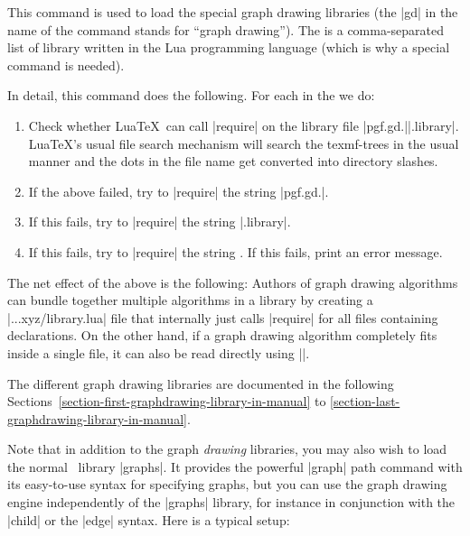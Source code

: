 \begin{command}{\usegdlibrary{}}
    This command is used to load the special graph drawing libraries (the |gd|
    in the name of the command stands for ``graph drawing''). The  is a comma-separated list of library written in the Lua
    programming language (which is why a special command is needed).

    In detail, this command does the following. For each  in the
     we do:
    \begin{enumerate}
        \item Check whether Lua\TeX\ can call |require| on the library file
            |pgf.gd.||.library|. Lua\TeX's usual file search
            mechanism  will search the texmf-trees in the usual manner and the
            dots in the file name get converted into directory slashes.
        \item If the above failed, try to |require| the string
            |pgf.gd.|.
        \item If this fails, try to |require| the string |.library|.
        \item If this fails, try to |require| the string . If this
            fails, print an error message.
    \end{enumerate}
    The net effect of the above is the following: Authors of graph drawing
    algorithms can bundle together multiple algorithms in a library by creating
    a |...xyz/library.lua| file that internally just calls |require| for all
    files containing declarations. On the other hand, if a graph drawing
    algorithm completely fits inside a single file, it can also be read
    directly using |\usegdlibrary|.
\begin{codeexample}
\usetikzlibrary{graphdrawing}
\end{codeexample}

    The different graph drawing libraries are documented in the following
    Sections~\ref{section-first-graphdrawing-library-in-manual} to
    \ref{section-last-graphdrawing-library-in-manual}.
\end{command}

Note that in addition to the graph \emph{drawing} libraries, you may also wish
to load the normal \tikzname\ library |graphs|. It provides the powerful
|graph| path command with its easy-to-use syntax for specifying graphs, but you
can use the graph drawing engine independently of the |graphs| library, for
instance in conjunction with the |child| or the |edge| syntax. Here is a
typical setup:
%
\begin{codeexample}
\usetikzlibrary{graphs, graphdrawing}
\end{codeexample}

